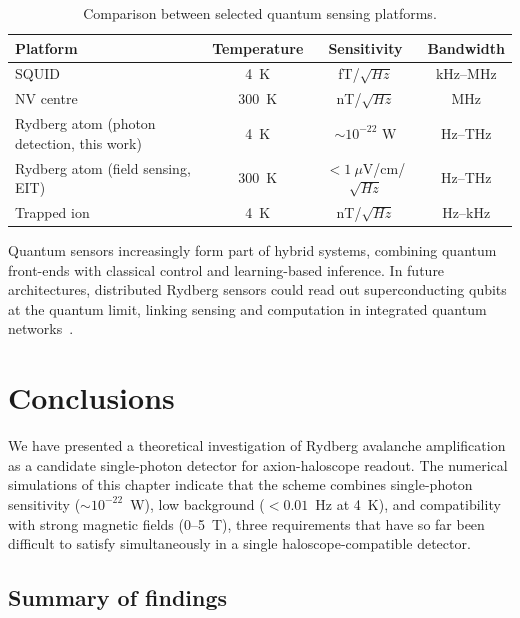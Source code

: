 \begin{table}[htbp]
\centering
\caption{Comparison between selected quantum sensing platforms.}
\small
\setlength{\tabcolsep}{4pt}
\begin{tabular}{lccc}
\toprule
Platform & Temperature & Sensitivity & Bandwidth \\
\midrule
SQUID & 4~K & fT/$\sqrt{Hz}$ & kHz--MHz \\
NV centre & 300~K & nT/$\sqrt{Hz}$ & MHz \\
Rydberg atom (photon detection, this work) & 4~K & $\sim 10^{-22}$ W & Hz--THz \\
Rydberg atom (field sensing, EIT) & 300~K & $<1~\mu$V/cm/$\sqrt{Hz}$ & Hz--THz \\
Trapped ion & 4~K & nT/$\sqrt{Hz}$ & Hz--kHz \\
\bottomrule
\end{tabular}
\label{tab:compare}
\end{table}

Quantum sensors increasingly form part of hybrid systems, combining quantum front-ends with classical control and learning-based inference. In future architectures, distributed Rydberg sensors could read out superconducting qubits at the quantum limit, linking sensing and computation in integrated quantum networks~\cite{Ezratty2024}.

\section{Conclusions}
\label{sec:axion_conclusions}

We have presented a theoretical investigation of Rydberg avalanche amplification as a candidate single-photon detector for axion-haloscope readout. The numerical simulations of this chapter indicate that the scheme combines single-photon sensitivity ($\sim 10^{-22}$~W), low background ($< 0.01$~Hz at 4~K), and compatibility with strong magnetic fields (0--5~T), three requirements that have so far been difficult to satisfy simultaneously in a single haloscope-compatible detector.

\subsection*{Summary of findings}


